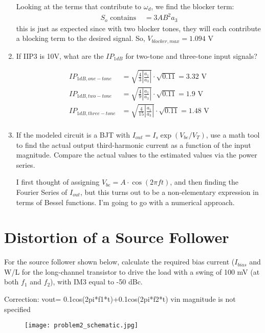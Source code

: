 \begin{enumerate}[label=(\alph*)]
    Looking at the terms that contribute to $\omega_d$, we find the blocker term:
    \begin{align*}
        S_o \text{ contains } &= 3 A B^2 a_3
    \end{align*}
    this is just as expected since with two blocker tones, they will each contribute a blocking term to the desired signal.
    So, $V_{blocker,max} = 1.094 \text{ V}$

    \item {\color{blue} If IIP3 is 10V, what are the $IP_{1dB}$ for two-tone and three-tone input signals?}

    \begin{align*}
        IP_{1dB,one-tone} &= \sqrt{\frac{4}{3} |\frac{a_1}{a_3}|} \cdot \sqrt{0.11} = 3.32 \text{ V} \\
        IP_{1dB,two-tone} &= \sqrt{\frac{4}{9} |\frac{a_1}{a_3}|} \cdot \sqrt{0.11} = 1.9 \text{ V}\\
        IP_{1dB,three-tone} &= \sqrt{\frac{4}{15} |\frac{a_1}{a_3}|} \cdot \sqrt{0.11} = 1.48 \text{ V} \\
    \end{align*}

    \item {\color{blue} If the modeled circuit is a BJT with $I_{out} = I_s \exp(V_{be}/V_{T})$, use a math tool to find the actual output third-harmonic current as a function of the input magnitude. Compare the actual values to the estimated values via the power series.}

    I first thought of assigning $V_{be} = A \cdot \cos(2 \pi f t)$, and then finding the Fourier Series of $I_{out}$, but this turns out to be a non-elementary expression in terms of Bessel functions. I'm going to go with a numerical approach.


\end{enumerate}

\section{Distortion of a Source Follower}
{\color{blue} For the source follower shown below, calculate the required bias current ($I_{bias}$ and W/L for the long-channel transistor to drive the load with a swing of 100 mV (at both $f_1$ and $f_2$), with IM3 equal to -50 dBc.}

{\color{red} Correction: vout= 0.1cos(2pi*f1*t)+0.1cos(2pi*f2*t) vin magnitude is not specified}

\begin{figure}[H]
    \centering \texttt{[image: problem2\_schematic.jpg]}
\end{figure}

